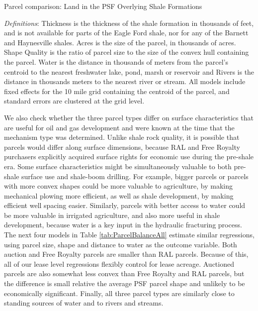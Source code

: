 \documentclass[12pt]{article}
\begin{document}
\addtolength{\tabcolsep}{6pt}
\begin{table}[htbp]
	\begin{center}
	\begin{threeparttable}
	\caption{Parcel comparison: Land in the PSF Overlying Shale Formations}
	\label{tab:ParcelBalanceAll}
	\small
	       
	\footnotesize
		\begin{tablenotes}			
			\item \textit{Definitions}: Thickness is the thickness of the shale formation in thousands of feet, and is not available for parts of the Eagle Ford shale, nor for any of the Barnett and Haynesville shales. Acres is the size of the parcel, in thousands of acres.  Shape Quality is the ratio of parcel size to the size of the convex hull containing the parcel. Water is the distance in thousands of meters from the parcel's centroid to the nearest freshwater lake, pond, marsh or reservoir and Rivers is the distance in thousands meters to the nearest river or stream. All models include fixed effects for the 10 mile grid containing the centroid of the parcel, and standard errors are clustered at the grid level.  
			\end{tablenotes}
	\end{threeparttable}
	\end{center}
\end{table}
\addtolength{\tabcolsep}{-6pt}

We also check whether the three parcel types differ on surface characteristics that are useful for oil and gas development and were known at the time that the mechanism type was determined. Unlike shale rock quality, it is possible that parcels would differ along surface dimensions, because RAL and Free Royalty purchasers explicitly acquired surface rights for economic use during the pre-shale era. Some surface characteristics might be simultaneously valuable to both pre-shale surface use and shale-boom drilling.  For example, bigger parcels or parcels with more convex shapes could be more valuable to agriculture, by making mechanical plowing more efficient, as well as shale development, by making efficient well spacing easier.  Similarly, parcels with better access to water could be more valuable in irrigated agriculture, and also more useful in shale development, because water is a key input in the hydraulic fracturing process. The next four models in Table \ref{tab:ParcelBalanceAll} estimate similar regressions, using parcel size, shape and distance to water as the outcome variable.  Both auction and Free Royalty parcels are smaller than RAL parcels.  Because of this, all of our lease level regressions flexibly control for lease acreage.  Auctioned parcels are also somewhat less convex than Free Royalty and RAL parcels, but the difference is small relative the average PSF parcel shape and unlikely to be economically significant.  Finally, all three parcel types are similarly close to standing sources of water and to rivers and streams.  
\end{document}
